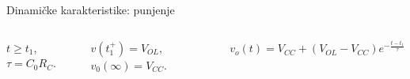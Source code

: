\begin{frame}[label=10-s029]{Dinamičke karakteristike: punjenje}
\setlength{\abovedisplayskip}{4pt}\setlength{\belowdisplayskip}{4pt}\setlength{\abovedisplayshortskip}{3pt}\setlength{\belowdisplayshortskip}{3pt}
\begin{columns}[T,onlytextwidth]\centering \end{columns}\medskip
\begin{columns}[T,onlytextwidth]
\centering
{}$t\geq t_1$, $\tau=C_0R_C$.\par
$v(t_1^+)=V_{OL}$, $v_0(\infty)=V_{CC}$.\par\medskip
$\displaystyle v_o(t)=V_{CC}+(V_{OL}-V_{CC})e^{-\frac{t-t_1}{\tau}}$
\centering
\end{columns}
\end{frame}
